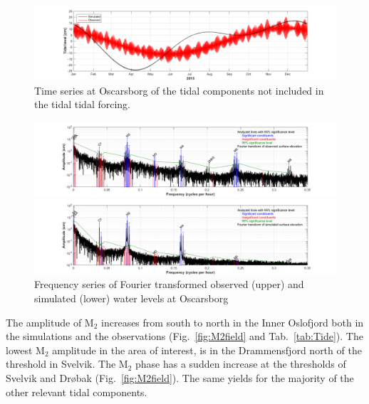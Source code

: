 \begin{figure}[tbh] 
\centerline{ 
\includegraphics*[trim=3cm 0cm 2.5cm 0cm,clip=true,width=\textwidth]{Figurer/Oscarsborg_Tide_not_included}  
} 
\caption{\small 
Time series at Oscarsborg of the tidal components not included in the tidal tidal forcing.} 
\label{fig:Waterlevel_tide} 
\end{figure} 

\begin{figure}[tbh] 
\centerline{ 
\includegraphics*[trim=3cm 0cm 2.5cm 0cm,clip=true,width=\textwidth]{Figurer/Oscarsborg_Tide_Frequency_obs.png}  
} 
\centerline{ 
\includegraphics*[trim=3cm 0cm 2.5cm 0cm,clip=true,width=\textwidth]{Figurer/Oscarsborg_Tide_Frequency_sim.png} 
} 
\caption{\small 
Frequency series of Fourier transformed observed (upper) and simulated (lower) water levels at Oscarsborg} 
\label{fig:Waterlevel_freq} 
\end{figure} 

\newpage 
The amplitude of M$_2$ increases from south to north in the Inner Oslofjord both in the simulations and the observations (Fig.~\ref{fig:M2field} and Tab.~\ref{tab:Tide}). The lowest M$_2$ amplitude in the area of interest, is in the Drammensfjord north of the threshold in Svelvik. The M$_2$ phase has a sudden increase at the thresholds of Svelvik and Dr{\o}bak (Fig.~\ref{fig:M2field}). The same yields for the majority of the other relevant tidal components.

